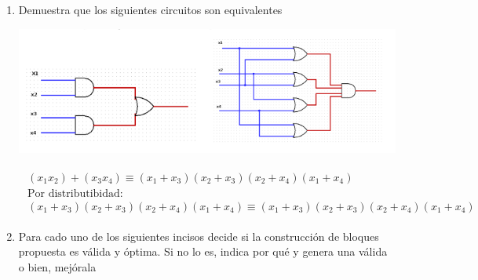 \documentclass[11pt,letterpaper]{article}
\begin{document}
\begin{enumerate}
    \item Demuestra que los siguientes circuitos son equivalentes
        \begin{center}
            \includegraphics[scale=.5]{./assets/1.png}
        \end{center}

        \begin{equation} \begin{split} \begin{gathered}
            (x_1 x_2) + (x_3 x_4) \equiv (x_1 + x_3) (x_2 + x_3) (x_2 + x_4) (x_1 + x_4) \\
            \text{Por distributibidad:} \\
            (x_1 + x_3) (x_2 + x_3) (x_2 + x_4) (x_1 + x_4) \equiv (x_1 + x_3) (x_2 + x_3) (x_2 + x_4) (x_1 + x_4)
        \end{gathered} \end{split} \end{equation}

    \item Para cado uno de los siguientes incisos decide si la construcción de bloques
    propuesta es válida y óptima. Si no lo es, indica por qué y genera una válida o bien, mejórala
        \begin{enumerate}
\end{enumerate}
\end{enumerate}
\end{document}
